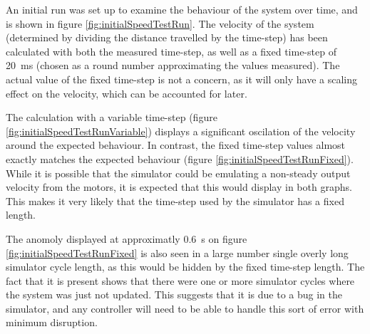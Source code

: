 \documentclass[10pt]{article}
\begin{document}
An initial run was set up to examine the behaviour of the system over time, and
is shown in figure \ref{fig:initialSpeedTestRun}.  The velocity of the system
(determined by dividing the distance travelled by the time-step) has been
calculated with both the measured time-step, as well as a fixed time-step of
\SI{20}{\milli\second} (chosen as a round number approximating the values
measured). The actual value of the fixed time-step is not a concern, as it will
only have a scaling effect on the velocity, which can be accounted for later.

The calculation with a variable time-step (figure
\ref{fig:initialSpeedTestRunVariable}) displays a significant oscilation of the
velocity around the expected behaviour.  In contrast, the fixed time-step values
almost exactly matches the expected behaviour (figure
\ref{fig:initialSpeedTestRunFixed}).  While it is possible that the simulator
could be emulating a non-steady output velocity from the motors, it is expected
that this would display in both graphs.  This makes it very likely that the
time-step used by the simulator has a fixed length.

The anomoly displayed at approximatly \SI{0.6}{\second} on figure
\ref{fig:initialSpeedTestRunFixed} is also seen in a large number  single overly
long simulator cycle length, as this would be hidden by the fixed time-step
length. The fact that it is present shows that there were one or more simulator
cycles where the system was just not updated.  This suggests that it is due to a
bug in the simulator, and any controller will need to be able to handle this
sort of error with minimum disruption.
\end{document}
